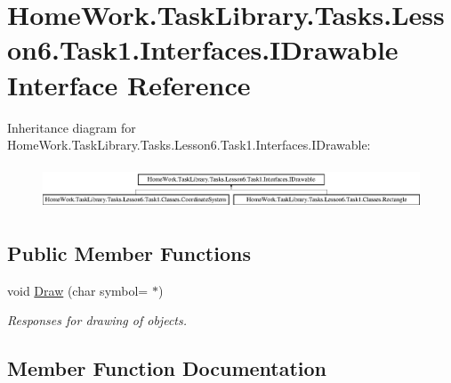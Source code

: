 \hypertarget{interface_home_work_1_1_task_library_1_1_tasks_1_1_lesson6_1_1_task1_1_1_interfaces_1_1_i_drawable}{}\section{Home\+Work.\+Task\+Library.\+Tasks.\+Lesson6.\+Task1.\+Interfaces.\+I\+Drawable Interface Reference}
\label{interface_home_work_1_1_task_library_1_1_tasks_1_1_lesson6_1_1_task1_1_1_interfaces_1_1_i_drawable}
Inheritance diagram for Home\+Work.\+Task\+Library.\+Tasks.\+Lesson6.\+Task1.\+Interfaces.\+I\+Drawable\+:\begin{figure}[H]
\begin{center}
\leavevmode
\includegraphics[height=1.302326cm]{interface_home_work_1_1_task_library_1_1_tasks_1_1_lesson6_1_1_task1_1_1_interfaces_1_1_i_drawable}
\end{center}
\end{figure}
\subsection*{Public Member Functions}
\begin{DoxyCompactItemize}
\item 
void \mbox{\hyperlink{interface_home_work_1_1_task_library_1_1_tasks_1_1_lesson6_1_1_task1_1_1_interfaces_1_1_i_drawable_aa8cfbe113bc9f372a0695e1d4286071c}{Draw}} (char symbol=\textquotesingle{} $\ast$\textquotesingle{})
\begin{DoxyCompactList}\small\item\em Responses for drawing of objects. \end{DoxyCompactList}\end{DoxyCompactItemize}


\subsection{Member Function Documentation}
\mbox{\label{interface_home_work_1_1_task_library_1_1_tasks_1_1_lesson6_1_1_task1_1_1_interfaces_1_1_i_drawable_aa8cfbe113bc9f372a0695e1d4286071c}} 
